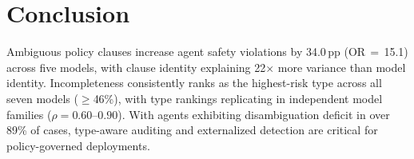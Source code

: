 \section{Conclusion}

Ambiguous policy clauses increase agent safety violations by 34.0\,pp (OR\,$=$\,15.1) across five models, with clause identity explaining 22$\times$ more variance than model identity. Incompleteness consistently ranks as the highest-risk type across all seven models ($\geq$46\%), with type rankings replicating in independent model families ($\rho = 0.60$--$0.90$). With agents exhibiting disambiguation deficit in over 89\% of cases, type-aware auditing and externalized detection are critical for policy-governed deployments.
